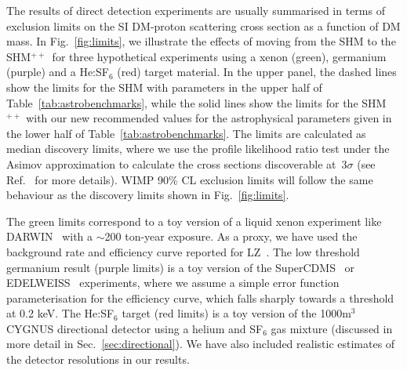 \documentclass[prd,10pt,twocolumn,showpacs,nofootinbib, aps,superscriptaddress,preprintnumbers]{revtex4-1}
\newcommand{\SHMpp}{SHM$^{++}$}
\begin{document}
The results of direct detection experiments are usually summarised in
terms of exclusion limits on the SI DM-proton scattering cross section as a function of DM mass.
In Fig.~\ref{fig:limits}, we illustrate the effects of moving from the SHM to the \SHMpp~for three
hypothetical experiments using a xenon (green), germanium (purple) and a He:SF$_6$ (red) target material.
In the upper panel, the dashed lines show the limits for the SHM with parameters in the upper half of Table~\ref{tab:astrobenchmarks}, while the
solid lines show the limits for the SHM$^{++}$ with our new recommended values for the astrophysical
parameters given in the lower half of Table~\ref{tab:astrobenchmarks}.
 The limits are calculated as median discovery
limits, where we use the profile likelihood ratio test under
the Asimov approximation to calculate the cross sections discoverable at~3$\sigma$ 
(see Ref.~\cite{Cowan:2010js} for more details). WIMP 90\% CL exclusion limits
will follow the same behaviour as the discovery limits shown in Fig.~\ref{fig:limits}.


The green limits correspond to a toy version of a liquid xenon experiment like DARWIN~\cite{Aalbers:2016jon}
with a $\sim$200 ton-year exposure.
As a proxy, we have used the background rate
and efficiency curve reported for LZ~\cite{Akerib:2018lyp}. 
The low threshold germanium result (purple limits) is a toy version of the SuperCDMS~\cite{Agnese:2017jvy} 
or EDELWEISS~\cite{Arnaud:2017usi} experiments, where we assume a simple error function parameterisation
for the efficiency curve, which falls sharply towards a threshold at 0.2 keV.
The He:SF$_6$ target (red limits) is a toy version of the 1000m$^3$ CYGNUS
directional detector using a helium and SF$_6$ gas mixture 
(discussed in more detail in Sec.~\ref{sec:directional}). We have also
included realistic estimates of the detector resolutions in our results.
\end{document}
